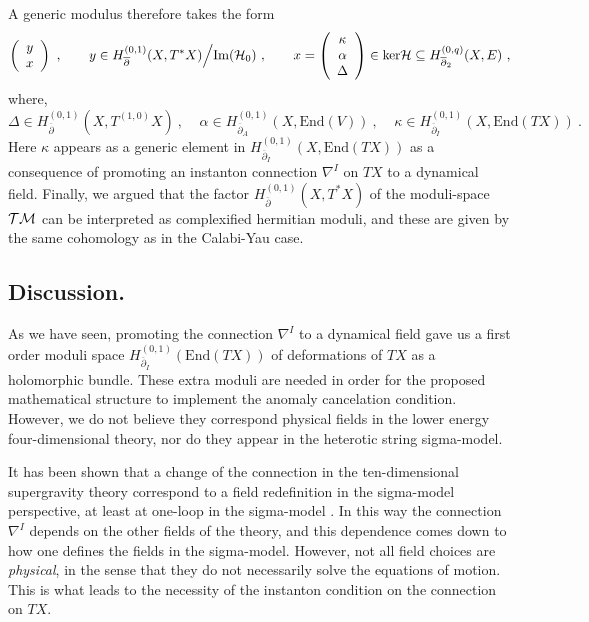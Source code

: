 \documentclass[12pt,a4paper]{article}
\def\bar#1{\overline{#1}}
\def\End{\textrm{End}}
\def\ker{\textrm{ker}}
\def\bp{\bar{\partial}}
\theoremstyle{definition}
\begin{document}
A generic modulus therefore takes the form
\begin{equation*}
\left(
\begin{array}{c}
y \\ x\\
\end{array}
\right)
~,\qquad
y\in H_{\bp}^{(0,1)}(X, T^*X)\Big/\textrm{Im}({\cal H}_0)
~,\qquad
x=\left(
\begin{array}{c}
\kappa \\ \alpha\\ \Delta
\end{array}
\right)
\in \ker{\cal H} \subseteq H_{\bp_2}^{(0,q)}(X, E)~,
\end{equation*} 
where, 
\begin{equation*}
\Delta\in H^{(0,1)}_{\bp}(X, T^{(1,0)}X)\:,\;\;\;\;\alpha\in H^{(0,1)}_{\bp_A}(X,\End(V))\:,\;\;\;\;\kappa\in H^{(0,1)}_{\bp_I}(X,\End(TX))\:.
\end{equation*}
Here $\kappa$ appears as a generic element in $H^{(0,1)}_{\bp_I}(X,\End(TX))$ as a consequence of promoting an instanton connection $\nabla^I$ on $TX$ to a dynamical field. 
Finally, we argued that the factor $H_{\bp}^{(0,1)}(X, T^*X)$  of the moduli-space $\cal TM$ can be interpreted as complexified hermitian moduli, and these are given by the same cohomology as in the Calabi-Yau case.


\subsection{Discussion.}

As we have seen, promoting the connection $\nabla^I$ to a dynamical field gave us a first order moduli space $H^{(0,1)}_{\bp_I}(\End(TX))$ of deformations of $TX$ as a holomorphic bundle. 
These extra moduli are needed in order for the proposed mathematical structure to implement the anomaly cancelation condition. However, we do not believe they correspond  physical fields in the lower energy four-dimensional theory, nor do they appear in the heterotic string sigma-model.

It has been shown that a change of the connection in the ten-dimensional supergravity theory correspond to a field redefinition in the sigma-model perspective, at least at one-loop in the sigma-model \cite{Sen1986289}. In this way the connection $\nabla^I$ depends on the other fields of the theory, and this dependence comes down to how one defines the fields in the sigma-model.  However, not all field choices are {\it physical}, in the sense that they do not necessarily solve the equations of motion. This is what leads to the necessity of the instanton condition on the connection on $TX$.
\end{document}
